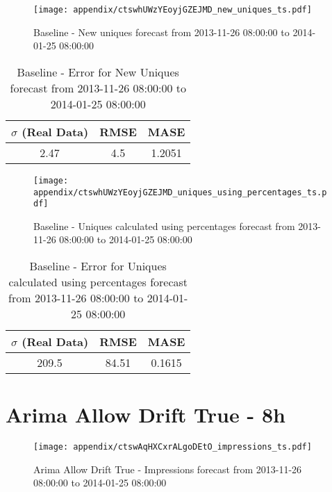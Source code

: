 \begin{figure}[H] \begin{center} \leavevmode
\texttt{[image: appendix/ctswhUWzYEoyjGZEJMD\_new\_uniques\_ts.pdf]} \caption[]{
Baseline - New uniques forecast from 2013-11-26 08:00:00 to 2014-01-25 08:00:00} \label{fig:appendix/ctswhUWzYEoyjGZEJMD_new_uniques_ts.pdf} \end{center}
\end{figure}

\begin{table}[H]
\centering
\footnotesize
\begin{tabular}{ccc}
$\sigma$ (Real Data) & RMSE & MASE   \\ \hline
2.47 & 4.5 & 1.2051 \\
\end{tabular}

\vspace{0.5cm}

\caption[]{
Baseline - Error for New Uniques forecast from 2013-11-26 08:00:00 to 2014-01-25 08:00:00}
\end{table}

\begin{figure}[H] \begin{center} \leavevmode
\texttt{[image: appendix/ctswhUWzYEoyjGZEJMD\_uniques\_using\_percentages\_ts.pdf]} \caption[]{
Baseline - Uniques calculated using percentages forecast from 2013-11-26 08:00:00 to 2014-01-25 08:00:00} \label{fig:appendix/ctswhUWzYEoyjGZEJMD_uniques_using_percentages_ts.pdf} \end{center}
\end{figure}

\begin{table}[H]
\centering
\footnotesize
\begin{tabular}{ccc}
$\sigma$ (Real Data) & RMSE & MASE   \\ \hline
209.5 & 84.51 & 0.1615 \\
\end{tabular}

\vspace{0.5cm}

\caption[]{
Baseline - Error for Uniques calculated using percentages forecast from 2013-11-26 08:00:00 to 2014-01-25 08:00:00}
\end{table}

\section{Arima Allow Drift True - 8h}
\begin{figure}[H] \begin{center} \leavevmode
\texttt{[image: appendix/ctswAqHXCxrALgoDEtO\_impressions\_ts.pdf]} \caption[]{
Arima Allow Drift True - Impressions forecast from 2013-11-26 08:00:00 to 2014-01-25 08:00:00} \label{fig:appendix/ctswAqHXCxrALgoDEtO_impressions_ts.pdf} \end{center}
\end{figure}

